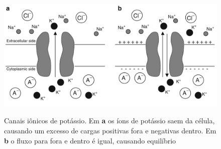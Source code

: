 \begin{figure}[tb!]
	\centering
	\caption[Canais iônicos de potássio]{Canais iônicos de potássio. Em \textbf{a} os íons de potássio saem da célula, causando um excesso de cargas positivas fora e negativas dentro. Em \textbf{b} o fluxo para fora e dentro é igual, causando equilíbrio}
	\label{fig:canaisions}
	\includegraphics[width=0.7\linewidth]{figs/canais_ions}
	\\
	\cite{ermentrout_mathematical_2010}
\end{figure}

\begin{table}
\end{table}

